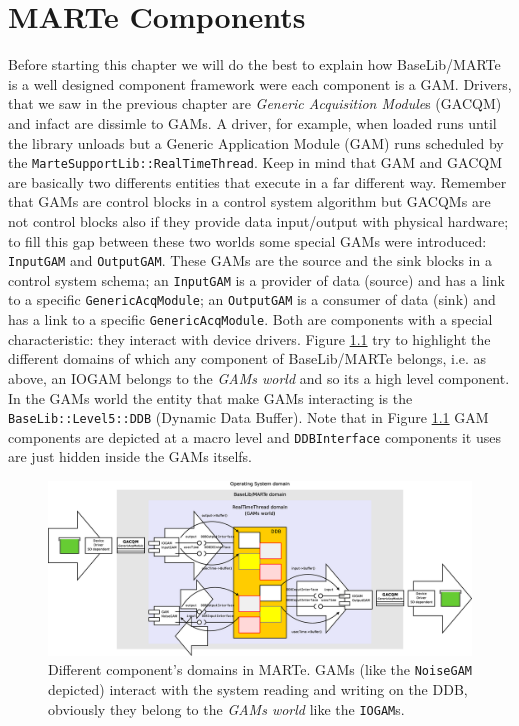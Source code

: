\chapter{MARTe Components}



Before starting this chapter we will do the best to explain how BaseLib/MARTe is a well designed component framework were each component is a GAM. Drivers, that we saw in the previous chapter are \textit{Generic Acquisition Module}s (GACQM) and infact are dissimle to GAMs. A driver, for example, when loaded runs until the library unloads but a Generic Application Module (GAM) runs scheduled by the \texttt{MarteSupportLib::RealTimeThread}. Keep in mind that GAM and GACQM are basically two differents entities that execute in a far different way. Remember that GAMs are control blocks in a control system algorithm but GACQMs are not control blocks also if they provide data input/output with physical hardware; to fill this gap between these two worlds some special GAMs were introduced: \texttt{InputGAM} and \texttt{OutputGAM}. These GAMs are the source and the sink blocks in a control system schema; an \texttt{InputGAM} is a provider of data (source) and has a link to a specific \texttt{GenericAcqModule}; an \texttt{OutputGAM} is a consumer of data (sink) and has a link to a specific \texttt{GenericAcqModule}. Both are components with a special characteristic: they interact with device drivers. Figure \ref{f:MARTe:IOGAMs_logic} try to highlight the different domains of which any component of BaseLib/MARTe belongs, i.e. as above, an IOGAM belongs to the \textit{GAMs world} and so its a high level component. In the GAMs world the entity that make GAMs interacting is the \texttt{BaseLib::Level5::DDB} (Dynamic Data Buffer). Note that in Figure \ref{f:MARTe:IOGAMs_logic} GAM components are depicted at a macro level and \texttt{DDBInterface} components it uses are just hidden inside the GAMs itselfs.

\begin{figure}[h!]
 \begin{center}
  \includegraphics[width=\textwidth]{MARTe/IOGAMs_logic.eps}
  \caption{Different component's domains in MARTe. GAMs (like the \texttt{NoiseGAM} depicted) interact with the system reading and writing on the DDB, obviously they belong to the \textit{GAMs world} like the \texttt{IOGAM}s.}
  \label{f:MARTe:IOGAMs_logic}
 \end{center}
\end{figure}

